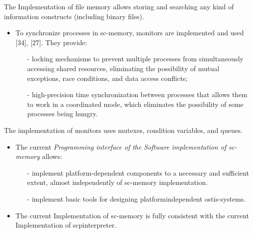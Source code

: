 \documentclass{article}
\begin{document}
\begin{multicols}{2}
\begin{itemize}
\begin{itemize}
\end{itemize}
\end{itemize}

The Implementation of file memory allows storing
and searching any kind of information constructs
(including binary files).

\begin{itemize}
\itemsep = 0mm
\item To synchronize processes in sc-memory, monitors
are implemented and used [34], [27]. They provide:

\begin{itemize}
\itemsep=0mm
\item[-]locking mechanisms to prevent multiple processes
from simultaneously accessing shared resources,
eliminating the possibility of mutual exceptions,
race conditions, and data access conflicts;


\item[-]high-precision time synchronization between processes that allows them to work in a coordinated
mode, which eliminates the possibility of some
processes being hungry.

\end{itemize}
\end{itemize}

The implementation of monitors uses mutexes, condition variables, and queues.

\begin{itemize}
\itemsep = 0mm
\item The current \textit{Programming interface of the Software
implementation of sc-memory} allows:
 
\begin{itemize}
\itemsep=0mm
\item[-]implement platform-dependent components to a
necessary and sufficient extent, almost independently of sc-memory implementation.


\item[-]implement basic tools for designing platformindependent ostis-systems.

\end{itemize}
\end{itemize}

\begin{itemize}
\itemsep = 0mm
\item  The current Implementation of sc-memory is fully
consistent with the current Implementation of scpinterpreter.
\end{itemize}


\end{multicols}
\end{document}
